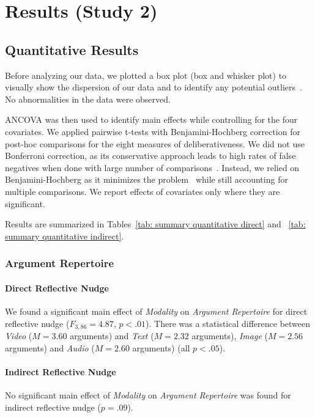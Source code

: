 \section{Results (Study 2)}
 
\subsection{Quantitative Results}
\label{sec: quantitative}
Before analyzing our data, we plotted a box plot (box and whisker plot) to visually show the dispersion of our data and to identify any potential outliers~\cite{schwertman2004simple, dawson2011significant}. No abnormalities in the data were observed. 

ANCOVA was then used to identify main effects while controlling for the four covariates. We applied pairwise t-tests with Benjamini-Hochberg correction for post-hoc comparisons for the eight measures of deliberativeness. We did not use Bonferroni correction, as its conservative approach leads to high rates of false negatives when done with large number of comparisons~\cite{thissen2002quick}. Instead, we relied on Benjamini-Hochberg as it minimizes the problem~\cite{nakagawa2004farewell} while still accounting for multiple comparisons. We report effects of covariates only where they are significant.

Results are summarized in Tables~\ref{tab: summary quantitative direct} and ~\ref{tab: summary quantitative indirect}.

\subsubsection{Argument Repertoire}

\paragraph{Direct Reflective Nudge} We found a significant main effect of \emph{Modality} on \emph{Argument Repertoire} for direct reflective nudge ($F_{3,86} = 4.87$, $p<.01$). There was a statistical difference between \emph{Video} ($M = 3.60$ arguments) and \emph{Text} ($M = 2.32$ arguments), \emph{Image} ($M = 2.56$ arguments) and \emph{Audio} ($M = 2.60$ arguments) (all $p<.05$). %

\paragraph{Indirect Reflective Nudge} No significant main effect of \emph{Modality} on \emph{Argument Repertoire} was found for indirect reflective nudge ($p=.09$).

